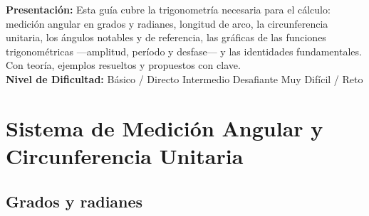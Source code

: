 \documentclass[12pt, letterpaper]{article}
\begin{document}

\vspace{4pt}
\begin{cuadroinfo}
  \small
  \textbf{Presentación:} Esta guía cubre la trigonometría necesaria para el cálculo: medición angular en grados y radianes, longitud de arco, la circunferencia unitaria, los ángulos notables y de referencia, las gráficas de las funciones trigonométricas —amplitud, período y desfase— y las identidades fundamentales. Con teoría, ejemplos resueltos y propuestos con clave.
  \\[4pt]
  \textbf{Nivel de Dificultad:}\quad
  \facil{} Básico / Directo \quad
  \medio{} Intermedio \quad
  \dificil{} Desafiante \quad
  \muyDificil{} Muy Difícil / Reto
\end{cuadroinfo}

\vspace{8pt}

\section{Sistema de Medición Angular y Circunferencia Unitaria}

\subsection{Grados y radianes}
\end{document}
